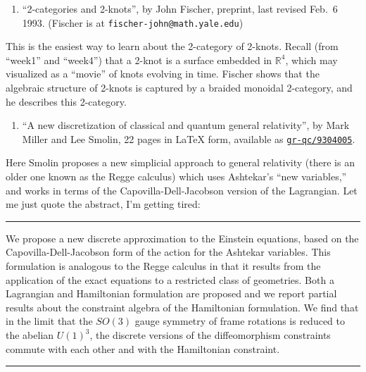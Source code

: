 \documentclass{article}
\def\tightlist{}
\begin{document}
\begin{enumerate}
\def\labelenumi{\arabic{enumi})}
\setcounter{enumi}{1}
\tightlist
\item
  ``2-categories and 2-knots'', by John Fischer, preprint, last revised
  Feb.~6 1993. (Fischer is at \texttt{fischer-john@math.yale.edu})
\end{enumerate}

This is the easiest way to learn about the 2-category of 2-knots. Recall
(from ``week1'' and ``week4'') that a 2-knot is a surface embedded in
\(\mathbb{R}^4\), which may visualized as a ``movie'' of knots evolving
in time. Fischer shows that the algebraic structure of 2-knots is
captured by a braided monoidal 2-category, and he describes this
2-category.

\begin{enumerate}
\def\labelenumi{\arabic{enumi})}
\setcounter{enumi}{2}
\tightlist
\item
  ``A new discretization of classical and quantum general relativity'',
  by Mark Miller and Lee Smolin, 22 pages in LaTeX form, available as
  \href{http://xxx.lanl.gov/abs/gr-qc/9304005}{\texttt{gr-qc/9304005}}.
\end{enumerate}

Here Smolin proposes a new simplicial approach to general relativity
(there is an older one known as the Regge calculus) which uses
Ashtekar's ``new variables,'' and works in terms of the
Capovilla-Dell-Jacobson version of the Lagrangian. Let me just quote the
abstract, I'm getting tired:

\begin{center}\rule{0.5\linewidth}{0.5pt}\end{center}

We propose a new discrete approximation to the Einstein equations, based
on the Capovilla-Dell-Jacobson form of the action for the Ashtekar
variables. This formulation is analogous to the Regge calculus in that
it results from the application of the exact equations to a restricted
class of geometries. Both a Lagrangian and Hamiltonian formulation are
proposed and we report partial results about the constraint algebra of
the Hamiltonian formulation. We find that in the limit that the
\(SO(3)\) gauge symmetry of frame rotations is reduced to the abelian
\(U(1)^3\), the discrete versions of the diffeomorphism constraints
commute with each other and with the Hamiltonian constraint.

\begin{center}\rule{0.5\linewidth}{0.5pt}\end{center}
\end{document}
